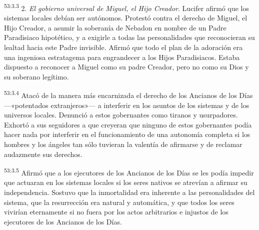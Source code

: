 \par
\textsuperscript{53:3.3} 2. \textit{El gobierno universal de Miguel, el Hijo Creador}. Lucifer afirmó que los sistemas locales debían ser autónomos. Protestó contra el derecho de Miguel, el Hijo Creador, a asumir la soberanía de Nebadon en nombre de un Padre Paradisiaco hipotético, y a exigirle a todas las personalidades que reconocieran su lealtad hacia este Padre invisible. Afirmó que todo el plan de la adoración era una ingeniosa estratagema para engrandecer a los Hijos Paradisiacos. Estaba dispuesto a reconocer a Miguel como su padre Creador, pero no como su Dios y su soberano legítimo.

\par
\textsuperscript{53:3.4} Atacó de la manera más encarnizada el derecho de los Ancianos de los Días ---«potentados extranjeros»--- a interferir en los asuntos de los sistemas y de los universos locales. Denunció a estos gobernantes como tiranos y usurpadores. Exhortó a sus seguidores a que creyeran que ninguno de estos gobernantes podía hacer nada por interferir en el funcionamiento de una autonomía completa si los hombres y los ángeles tan sólo tuvieran la valentía de afirmarse y de reclamar audazmente sus derechos.

\par
\textsuperscript{53:3.5} Afirmó que a los ejecutores de los Ancianos de los Días se les podía impedir que actuaran en los sistemas locales si los seres nativos se atrevían a afirmar su independencia. Sostuvo que la inmortalidad era inherente a las personalidades del sistema, que la resurrección era natural y automática, y que todos los seres vivirían eternamente si no fuera por los actos arbitrarios e injustos de los ejecutores de los Ancianos de los Días.

